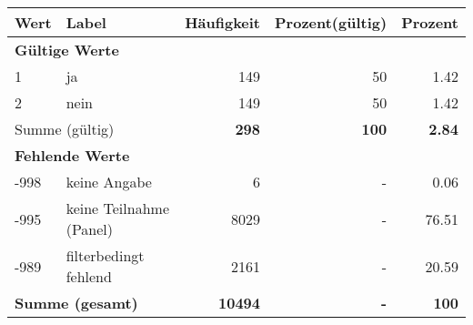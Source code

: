      \begin{longtable}{lXrrr}
     \toprule
     \textbf{Wert} & \textbf{Label} & \textbf{Häufigkeit} & \textbf{Prozent(gültig)} & \textbf{Prozent} \\
     \endhead
     \midrule
     \multicolumn{5}{l}{\textbf{Gültige Werte}}\\

     1 &
     \multicolumn{1}{X}{ ja   } &


       \num{149} &
       \num[round-mode=places,round-precision=2]{50} &
         \num[round-mode=places,round-precision=2]{1.42} \\

     2 &
     \multicolumn{1}{X}{ nein   } &


       \num{149} &
       \num[round-mode=places,round-precision=2]{50} &
         \num[round-mode=places,round-precision=2]{1.42} \\
     \midrule
     \multicolumn{2}{l}{Summe (gültig)} &
       \textbf{\num{298}} &
     \textbf{\num{100}} &
       \textbf{\num[round-mode=places,round-precision=2]{2.84}} \\
     \multicolumn{5}{l}{\textbf{Fehlende Werte}}\\
       -998 &
       keine Angabe &
         \num{6} &
        - &
         \num[round-mode=places,round-precision=2]{0.06} \\
       -995 &
       keine Teilnahme (Panel) &
         \num{8029} &
        - &
         \num[round-mode=places,round-precision=2]{76.51} \\
       -989 &
       filterbedingt fehlend &
         \num{2161} &
        - &
         \num[round-mode=places,round-precision=2]{20.59} \\
     \midrule
     \multicolumn{2}{l}{\textbf{Summe (gesamt)}} &
          \textbf{\num{10494}} &
        \textbf{-} &
        \textbf{\num{100}} \\
     \bottomrule
     \end{longtable}
     
